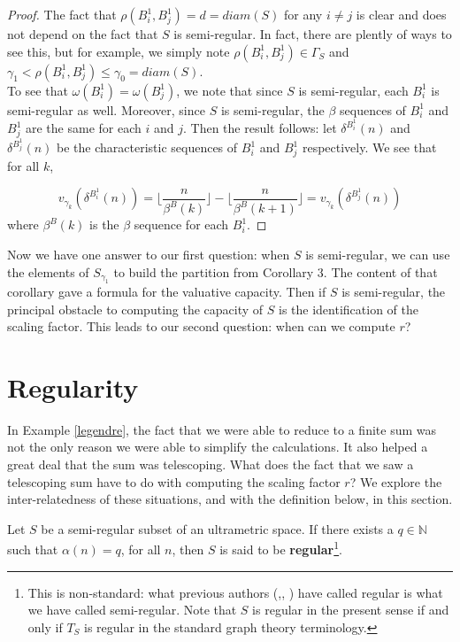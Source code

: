 \begin{proof}
	The fact that  $\rho(B^1_i, B^1_j) = d = diam(S)$ for any $i \neq j$ is clear and does not depend on the fact that $S$ is semi-regular. In fact, there are plently of ways to see this, but for example, we simply note $\rho(B^1_i, B^1_j) \in \Gamma_S$  and $ \gamma_1 < \rho(B^1_i, B^1_j)\leq \gamma_0 = diam(S)$.\\
	
	To see that $\omega( B^1_i) = \omega( B^1_j)$, we note that since $S$ is semi-regular, each $B^1_i$ is semi-regular as well. Moreover, since $S$ is semi-regular, the $\beta$ sequences of $B^1_i$ and $B^1_j$ are the same for each $i$ and $j$. Then the result follows: let $\delta^{B^1_i}(n)$ and $\delta^{B^1_j}(n)$ be the characteristic sequences of $B^1_i$ and $B^1_j$ respectively. We see that for all $k$,
	  
	  \[v_{\gamma_k}(\delta^{B^1_i}(n)) =  \lfloor\frac{n}{\beta^B(k)}\rfloor - \lfloor\frac{n}{\beta^B(k+1)}\rfloor =  v_{\gamma_k}(\delta^{B^1_j}(n)) \]
	where $\beta^B(k)$ is the $\beta$ sequence for each  $B^1_i$.
	 
\end{proof}

Now we have one answer to our first question: when $S$ is semi-regular, we can use the elements of $S_{\gamma_1}$ to build the partition from Corollary 3. The content of that corollary gave a formula for the valuative capacity. Then if $S$ is semi-regular, the principal obstacle to computing the capacity of $S$ is the identification of the scaling factor. This leads to our second question: when can we compute $r$?

\section{Regularity}
In Example \ref{legendre}, the fact that we were able to reduce to a finite sum was not the only reason we were able to simplify the calculations. It also helped a great deal that the sum was telescoping. What does the fact that we saw a telescoping sum have to do with computing the scaling factor $r$? We explore the inter-relatedness of these situations, and with the definition below, in this section.

\begin{definition}
Let $S$ be a semi-regular subset of an ultrametric space. If there exists a $q \in \mathbb{N}$ such that $\alpha(n) = q$, for all $n$, then $S$ is said to be \textbf{regular}\footnote{This is non-standard: what previous authors (\cite{amice},\cite{cef}, \cite{fp}) have called regular is what we have called semi-regular. Note that $S$ is regular in the present sense if and only if $T_S$ is regular in the standard graph theory terminology.}. %
\end{definition}

